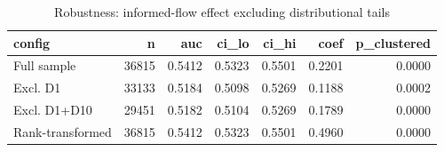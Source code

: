 \begin{table}
\caption{Robustness: informed-flow effect excluding distributional tails}
\label{tab:insider_robust}
\begin{tabular}{lrrrrrr}
\toprule
config & n & auc & ci_lo & ci_hi & coef & p_clustered \\
\midrule
Full sample & 36815 & 0.5412 & 0.5323 & 0.5501 & 0.2201 & 0.0000 \\
Excl. D1 & 33133 & 0.5184 & 0.5098 & 0.5269 & 0.1188 & 0.0002 \\
Excl. D1+D10 & 29451 & 0.5182 & 0.5104 & 0.5269 & 0.1789 & 0.0000 \\
Rank-transformed & 36815 & 0.5412 & 0.5323 & 0.5501 & 0.4960 & 0.0000 \\
\bottomrule
\end{tabular}
\end{table}
